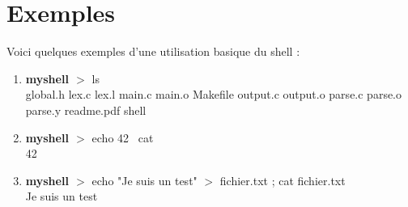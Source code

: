 \documentclass[10pt,a4paper]{article}
\begin{document}
\section{Exemples }
	Voici quelques exemples d'une utilisation basique du shell :
\begin{enumerate}
	\item \textbf{myshell $>$} ls \\ global.h  lex.c  lex.l  main.c  main.o  Makefile  output.c  output.o  parse.c  parse.o  parse.y  readme.pdf  shell
	\item \textbf{myshell $>$} echo 42 \textbar \ cat \\ 42
	\item \textbf{myshell $>$} echo "Je suis un test" $>$ fichier.txt ; cat fichier.txt \\ Je suis un test
\end{enumerate}
\end{document}

